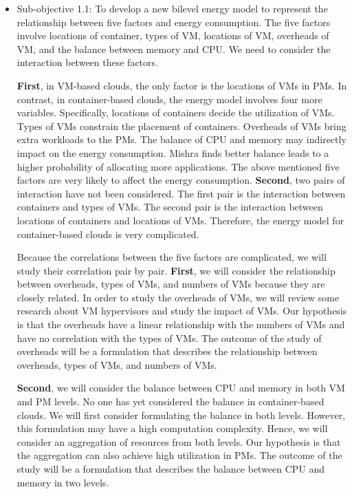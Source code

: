\begin{itemize}
	\item Sub-objective 1.1: To develop a new bilevel energy model to represent the relationship between five factors and energy consumption. The five factors involve locations of container, types of VM, locations of VM, overheads of VM, and the balance between memory and CPU. We need to consider the interaction between these factors.


	\textbf{First}, in VM-based clouds, the only factor is the locations of VMs in PMs. In contrast, in container-based clouds,  the energy model involves four more variables. Specifically, locations of containers decide the utilization of VMs. Types of VMs constrain the placement of containers. Overheads of VMs bring extra workloads to the PMs. The balance of CPU and memory may indirectly impact on the energy consumption. Mishra \cite{Mishra:2011bz} finds better balance leads to a higher probability of allocating more applications. The above mentioned five factors are very likely to affect the energy consumption. \textbf{Second}, two pairs of interaction have not been considered. The first pair is the interaction between containers and types of VMs. The second pair is the interaction between locations of containers and locations of VMs. Therefore, the energy model for container-based clouds is very complicated.


	 Because the correlations between the five factors are complicated, we will study their correlation pair by pair. 
	\textbf{First}, we will consider the relationship between overheads, types of VMs, and numbers of VMs because they are closely related. In order to study the overheads of VMs, we will review some research about VM hypervisors and study the impact of VMs. Our hypothesis is that the overheads have a linear relationship with the numbers of VMs and have no correlation with the types of VMs. The outcome of the study of overheads will be a formulation that describes the relationship between overheads, types of VMs, and numbers of VMs.


	\textbf{Second}, we will consider the balance between CPU and memory in both VM and PM levels. No one has yet considered the balance in container-based clouds. We 
	will first consider formulating the balance in both levels. However, this formulation may have a high computation complexity. Hence, we will consider an aggregation of resources from both levels. Our hypothesis is that the aggregation can also achieve high utilization in PMs. The outcome of the study will be a formulation that describes the balance between CPU and memory in two levels.


\end{itemize}
